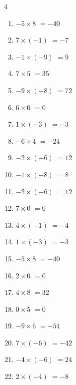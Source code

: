 \begin{multicols}{4}
\begin{enumerate}
  \item $-5\times 8$
        $=-40$

  \item $7\times (-1)$
        $=-7$

  \item $-1\times (-9)$
        $=9$

  \item $7\times 5$
        $=35$

  \item $-9\times (-8)$
        $=72$

  \item $6\times 0$
        $=0$

  \item $1\times (-3)$
        $=-3$

  \item $-6\times 4$
        $=-24$

  \item $-2\times (-6)$
        $=12$

  \item $-1\times (-8)$
        $=8$

\columnbreak %

\resetques

  \item $-2\times (-6)$
        $=12$

  \item $7\times 0$
        $=0$

  \item $4\times (-1)$
        $=-4$

  \item $1\times (-3)$
        $=-3$

  \item $-5\times 8$
        $=-40$

  \item $2\times 0$
        $=0$

  \item $4\times 8$
        $=32$

  \item $0\times 5$
        $=0$

  \item $-9\times 6$
        $=-54$

  \item $7\times (-6)$
        $=-42$

  \item $-4\times (-6)$
        $=24$

  \item $2\times (-4)$
        $=-8$


\end{enumerate}
\end{multicols}
